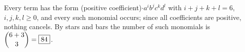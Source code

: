 Every term has the form (positive coefficient)$\cdot a^ib^jc^kd^l$ with $i+j+k+l=6$, $i,j,k,l\ge0$, and every such monomial occurs; since all coefficients are positive, nothing cancels. By stars and bars the number of such monomials is $\dbinom{6+3}{3}=\boxed{84}$.
